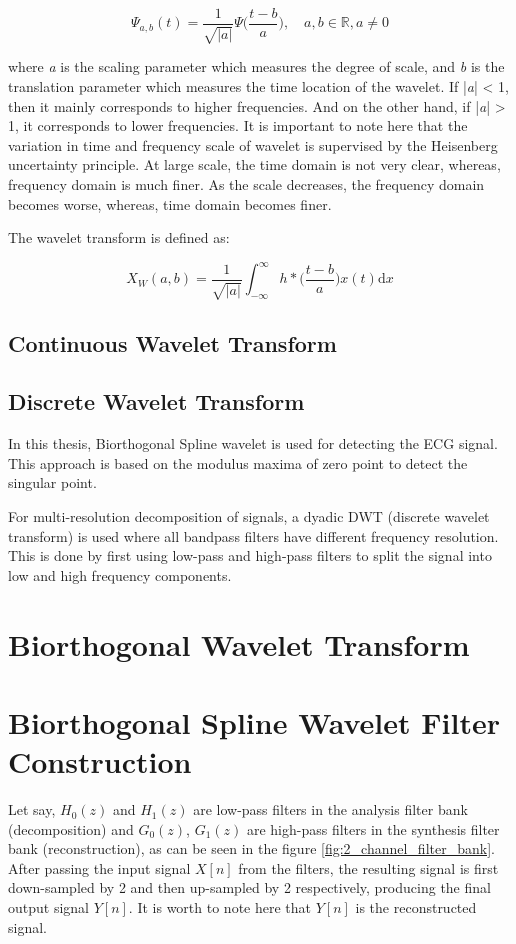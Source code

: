 \begin{equation} \label{eqn_mother_wavelet}
{\Psi_{a,b}(t) = \frac{1}{\sqrt{|a|}}\Psi \bigg(\frac{t-b}{a}\bigg),\quad a, b \in \mathbb{R}, a \neq 0}
\end{equation}

where \textit{a} is the scaling parameter which measures the degree of scale, and \textit{b} is the translation parameter which measures the time location of the wavelet. If |\textit{a}| < 1, then it mainly corresponds to higher frequencies. And on the other hand, if |\textit{a}| > 1, it corresponds to lower frequencies. It is important to note here that the variation in time and frequency scale of wavelet is supervised by the Heisenberg uncertainty principle. At large scale, the time domain is not very clear, whereas, frequency domain is much finer. As the scale decreases, the frequency domain becomes worse, whereas, time domain becomes finer.

The wavelet transform is defined as:

\begin{equation} \label{eqn_wavelet_transform}
{X_{W}(a, b) = \frac{1}{\sqrt{|a|}} \int_{-\infty}^\infty h*\bigg(\frac{t-b}{a}\bigg)x(t) \mathrm{d}x}
\end{equation}


\subsection{Continuous Wavelet Transform}
\subsection{Discrete Wavelet Transform}

In this thesis, Biorthogonal Spline wavelet is used for detecting the ECG signal. This approach is based on the modulus maxima of zero point to detect the singular point. 


For multi-resolution decomposition of signals, a dyadic DWT (discrete wavelet transform) is used where all bandpass filters have different frequency resolution. This is done by first using low-pass and high-pass filters to split the signal into low and high frequency components.
\section{Biorthogonal Wavelet Transform}


\section{Biorthogonal Spline Wavelet Filter Construction}
 Let say, ${H_{0}(z)}$ and ${H_{1}(z)}$ are low-pass filters in the analysis filter bank (decomposition) and ${G_{0}(z)}$, ${G_{1}(z)}$ are high-pass filters in the synthesis filter bank (reconstruction), as can be seen in the figure \ref{fig:2_channel_filter_bank}. After passing the input signal $X[n]$ from the filters, the resulting signal is first down-sampled by 2 and then up-sampled by 2  respectively, producing the final output signal $Y[n]$. It is worth to note here that $Y[n]$ is the reconstructed signal. 
 
